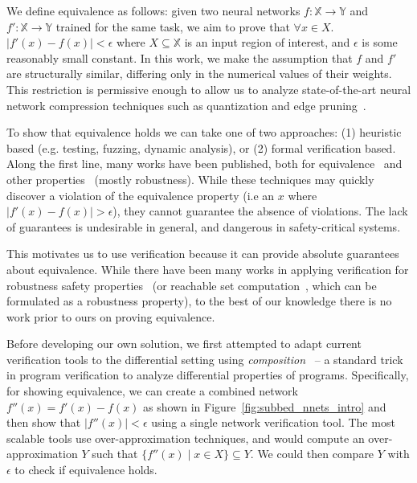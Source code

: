 We define equivalence as follows: given two neural networks $ f : \mathbb{X} \to
\mathbb{Y} $ and $ f' : \mathbb{X} \to \mathbb{Y} $ trained for the same task,
we aim to prove that $ \forall x \in X $. $ |f'(x) - f(x)| < \epsilon $ where $ X
\subseteq \mathbb{X} $ is an input region of interest, and $ \epsilon $ is some
reasonably small constant. In this work, we make the assumption that $ f $ and $
f' $ are structurally similar, differing only in the numerical values of their
weights. This restriction is permissive enough to allow us to analyze
state-of-the-art neural network compression techniques such as quantization and
edge pruning~\cite{HanMD16}.

To show that equivalence holds we can take one of two approaches: (1) heuristic
based (e.g. testing, fuzzing, dynamic analysis), or (2) formal verification
based. Along the first line, many works have been published, both for
equivalence~\cite{xie2019diffchaser,PeiCYJ17,MaLLZG18} and other
properties~\cite{ma2018deepgauge,xie2019deephunter,SunWRHKK18,TianPJR18,
odena2018tensorfuzz} (mostly robustness). While these techniques
may quickly discover a violation of the equivalence property (i.e an $ x $ where
$ |f'(x) - f(x)| > \epsilon $), they cannot guarantee the
absence of violations. The lack of guarantees is undesirable in general, and
dangerous in safety-critical systems.

This motivates us to use verification because it can provide absolute guarantees
about equivalence. While there have been many works in applying verification for
robustness safety properties~\cite{HuangKWW17,Ehlers17,KatzHIJLLSTWZDK19,RuanHK18,
WangPWYJ18nips,SinghGPV19iclr,MirmanGV18,GehrMDTCV18,FischerBDGZV19} (or reachable
set computation~\cite{hu2020reach,everett2021icra}, which can be
formulated as a robustness property), to the best of our knowledge there is no work
prior to ours on proving equivalence.

Before developing our own solution, we first attempted to adapt current
verification tools to the differential setting using
\textit{composition}~\cite{barthe2011secure,terauchi2005secure,barthe2011relational}
 -- a standard trick in program verification to analyze differential properties of
 programs. Specifically, for showing equivalence, we can
create a combined network $ f''(x) = f'(x) - f(x) $ as shown in
Figure~\ref{fig:subbed_nnets_intro}
and then show that $ |f''(x)| < \epsilon $ using a single network verification
tool. The most scalable tools use over-approximation techniques, and would
compute an over-approximation $ Y $ such that $ \{f''(x) \; | \; x \in X \}
\subseteq Y $. We could then compare $ Y $ with $ \epsilon $ to check if
equivalence holds.

